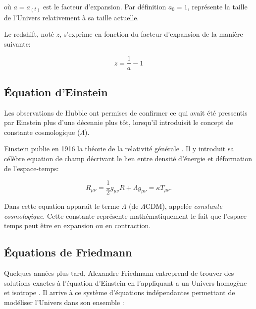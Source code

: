 où $a = a_{(t)}$ est le facteur d'expansion.
Par définition $a_0 = 1$,  représente la taille de l'Univers relativement à sa taille actuelle.

Le redshift, noté $z$, s'exprime en fonction du facteur d'expansion de la manière suivante:

\begin{equation}
z= \frac{1}{a}-1
\end{equation}

\subsection{Équation d'Einstein}

Les observations de Hubble ont permises de confirmer ce qui avait été pressentis par Einstein plus d'une décennie plus tôt, lorsqu'il introduisit le concept de constante cosmologique ($\Lambda$). 

Einstein publie en 1916 la théorie de la relativité générale \citep{1916AnP...354..769E}.
Il y introduit sa célèbre equation de champ décrivant le lien entre densité d'énergie et déformation de l'espace-temps:

\begin{equation}
R_{\mu\nu} = \frac{1}{2} g_{\mu\nu}R + \Lambda g_{\mu\nu}  = \kappa T_{\mu\nu}.
\label{eq:einstein}
\end{equation} 

Dans cette equation apparaît le terme $\Lambda$ (de $\Lambda$CDM), appelée \textit{constante cosmologique}.
Cette constante représente mathématiquement le fait que l'espace-temps peut être en expansion ou en contraction.

\subsection{Équations de Friedmann}
\label{sec:friedman}

Quelques années plus tard, Alexandre Friedmann entreprend de trouver des solutions exactes à l'équation d'Einstein en l'appliquant a un Univers homogène et isotrope \citep{1922ZPhy...10..377F}.
Il arrive à ce système d'équations indépendantes permettant de modéliser l'Univers dans son ensemble :

% 
%
% 
 
